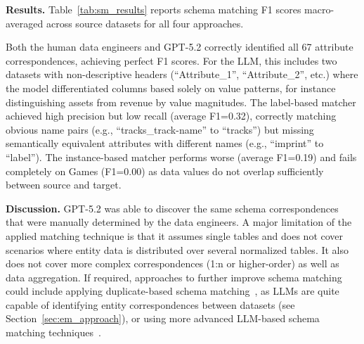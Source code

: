 

\textbf{Results.} \label{sec:sm_results}
Table~\ref{tab:sm_results} reports schema matching F1 scores macro-averaged across source datasets for all four approaches.

Both the human data engineers and GPT-5.2 correctly identified all 67 attribute correspondences, achieving perfect F1 scores. For the LLM, this includes two datasets with non-descriptive headers (``Attribute\_1'', ``Attribute\_2'', etc.) where the model differentiated columns based solely on value patterns, for instance distinguishing assets from revenue by value magnitudes. The label-based matcher achieved high precision but low recall (average F1=0.32), correctly matching obvious name pairs (e.g., ``tracks\_track-name'' to ``tracks'') but missing semantically equivalent attributes with different names (e.g., ``imprint'' to ``label''). The instance-based matcher performs worse (average F1=0.19) and fails completely on Games (F1=0.00) as data values do not overlap sufficiently between source and target.

 
\textbf{Discussion.}\label{sec:sm_limitations} GPT-5.2 was able to discover the same schema correspondences that were manually determined by the data engineers. A major limitation of the applied matching technique is that it assumes single tables and does not cover scenarios where entity data is distributed over several normalized tables. It also does not cover more complex correspondences (1:n or higher-order) as well as data aggregation. If required, approaches to further improve schema matching could include applying duplicate-based schema matching~\cite{naumann2006dataFusionThreeSteps}, as LLMs are quite capable of identifying entity correspondences between datasets (see Section~\ref{sec:em_approach}), or using more advanced LLM-based schema matching techniques~\cite{liu2025magneto}.

